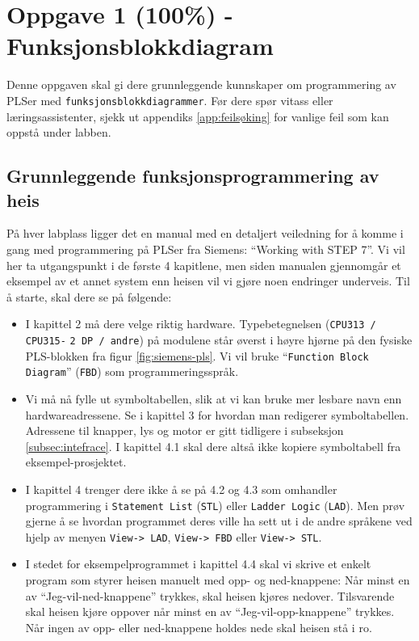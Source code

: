 \section{Oppgave 1 (100\%) - Funksjonsblokkdiagram}\label{sec:3-oppgave1}

Denne oppgaven skal gi dere grunnleggende kunnskaper om programmering av PLSer med \verb|funksjonsblokkdiagrammer|. Før dere spør vitass eller læringsassistenter, sjekk ut appendiks \ref{app:feilsøking} for vanlige feil som kan oppstå under labben.

\subsection{Grunnleggende funksjonsprogrammering av heis}

På hver labplass ligger det en manual med en detaljert veiledning for å komme i gang med programmering på PLSer fra Siemens: “Working with STEP 7”. Vi vil her ta utgangspunkt i de første 4 kapitlene, men siden manualen gjennomgår et eksempel av et annet system enn heisen
vil vi gjøre noen endringer underveis. Til å starte, skal dere se på følgende:

\begin{itemize}
        \item I kapittel 2 må dere velge riktig hardware. Typebetegnelsen (\verb|CPU313 / CPU315-| 
        \verb|2 DP / andre|) på modulene står øverst i høyre hjørne på den fysiske PLS-blokken fra figur \ref{fig:siemens-pls}. Vi vil bruke “\verb|Function Block Diagram|” (\verb|FBD|) som
programmeringsspråk.


\item Vi må nå fylle ut symboltabellen, slik at vi kan bruke mer lesbare navn enn hardwareadressene.
Se i kapittel 3 for hvordan man redigerer symboltabellen. Adressene til
knapper, lys og motor er gitt tidligere i subseksjon \ref{subsec:intefrace}. I kapittel 4.1 skal dere altså ikke
kopiere symboltabell fra eksempel-prosjektet.

\item I kapittel 4 trenger dere ikke å se på 4.2 og 4.3 som omhandler programmering i \verb|Statement List| (\verb|STL|) eller \verb|Ladder Logic| (\verb|LAD|). Men prøv gjerne å se hvordan programmet deres ville
ha sett ut i de andre språkene ved hjelp av menyen \verb|View-> LAD|, \verb|View-> FBD| eller \verb|View-> STL|.
\item I stedet for eksempelprogrammet i kapittel 4.4 skal vi skrive et enkelt program som styrer
heisen manuelt med opp- og ned-knappene: Når minst en av “Jeg-vil-ned-knappene”
trykkes, skal heisen kjøres nedover. Tilsvarende skal heisen kjøre oppover når minst en av
“Jeg-vil-opp-knappene” trykkes. Når ingen av opp- eller ned-knappene holdes nede skal
heisen stå i ro.
\end{itemize}

